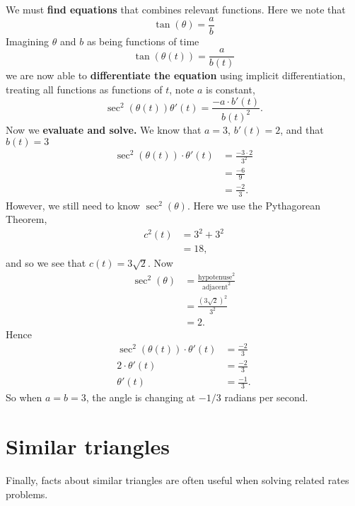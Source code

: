 \documentclass{ximera}
\begin{document}
\begin{example}
\begin{explanation}
    We must \textbf{find equations} that combines relevant
    functions. Here we note that
    \[
    \tan(\theta) = \frac{a}{b}
    \]
    Imagining $\theta$ and $b$ as being functions of time
    \[
    \tan(\theta(t)) = \frac{a}{b(t)}
    \]
    we are now able to \textbf{differentiate the equation} using
    implicit differentiation, treating all functions as functions of
    $t$, note $a$ is constant,
    \[
    \sec^2(\theta(t))\theta'(t) = \frac{-a\cdot b'(t)}{b(t)^2}.
    \]
    Now we \textbf{evaluate and solve.}  We
    know that $a=3$, $b'(t) = 2$, and that $b(t) = 3$
    \begin{align*}
    \sec^2(\theta(t))\cdot \theta'(t) &= \frac{-3\cdot 2}{3^2}\\
    &= \frac{-6}{9}\\
    &= \frac{-2}{3}.
    \end{align*}
    However, we still need to know $\sec^2(\theta)$. Here we use the
    Pythagorean Theorem,
    \begin{align*}
    c^2(t) &= 3^2 + 3^2\\
    &=18,
    \end{align*}
    and so we see that $c(t) = 3\sqrt{2}$. Now
    \begin{align*}
      \sec^2(\theta) &= \frac{\mathrm{hypotenuse}^2}{\mathrm{adjacent}^2}\\
      &= \frac{\left(3\sqrt{2}\right)^2}{3^2}\\
      &= 2.
    \end{align*}
    Hence
    \begin{align*}
      \sec^2(\theta(t))\cdot \theta'(t) &= \frac{-2}{3}\\
      2\cdot \theta'(t) &= \frac{-2}{3}\\
      \theta'(t) &= \frac{-1}{3}.
    \end{align*}
    So when $a=b=3$, the angle is changing at $-1/3$ radians per second.
  \end{explanation}
\end{example}



\section{Similar triangles}

Finally, facts about similar triangles are often useful when solving
related rates problems.
\end{document}
